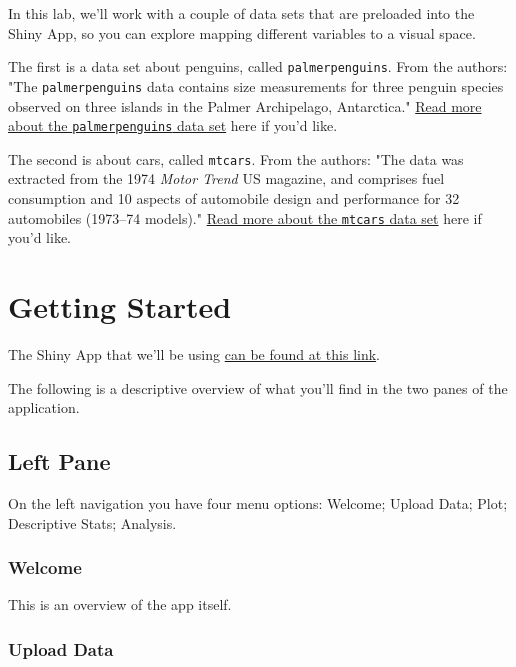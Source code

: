 \documentclass[
]{book}
\begin{document}
In this lab, we'll work with a couple of data sets that are preloaded into the Shiny App, so you can explore mapping different variables to a visual space.

The first is a data set about penguins, called \texttt{palmerpenguins}. From the authors: "The \texttt{palmerpenguins} data contains size measurements for three penguin species observed on three islands in the Palmer Archipelago, Antarctica." \href{https://www.rdocumentation.org/packages/palmerpenguins/versions/0.1.0}{Read more about the \texttt{palmerpenguins} data set} here if you'd like.

The second is about cars, called \texttt{mtcars}. From the authors: "The data was extracted from the 1974 \emph{Motor Trend} US magazine, and comprises fuel consumption and 10 aspects of automobile design and performance for 32 automobiles (1973--74 models)." \href{https://stat.ethz.ch/R-manual/R-devel/library/datasets/html/mtcars.html}{Read more about the \texttt{mtcars} data set} here if you'd like.

\hypertarget{getting-started}{%
\section*{Getting Started}\label{getting-started}}

The Shiny App that we'll be using \href{https://openscience.ok.ubc.ca/shiny/BIOL-116/}{can be found at this link}.

The following is a descriptive overview of what you'll find in the two panes of the application.

\hypertarget{left-pane}{%
\subsection*{Left Pane}\label{left-pane}}

On the left navigation you have four menu options: Welcome; Upload Data; Plot; Descriptive Stats; Analysis.

\hypertarget{welcome-1}{%
\subsubsection*{Welcome}\label{welcome-1}}

This is an overview of the app itself.

\hypertarget{upload-data}{%
\subsubsection*{Upload Data}\label{upload-data}}
\end{document}
